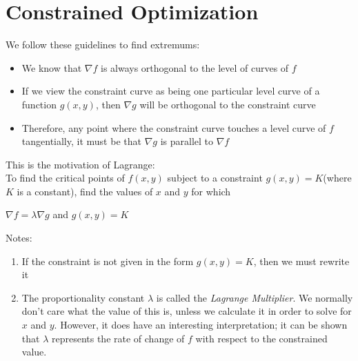 \documentclass[12pt]{report}
\begin{document}
	\section{Constrained Optimization}
		We follow these guidelines to find extremums:
		\begin{itemize}
			\item We know that $\nabla f$ is always orthogonal to the level of curves of $f$
			\item If we view the constraint curve as being one particular level curve of a function $g(x,y)$, then $\nabla g$ will be orthogonal to the constraint curve
			\item Therefore, any point where the constraint curve touches a level curve of $f$ tangentially, it must be that $\nabla g$ is parallel to $\nabla f$
		\end{itemize}
		This is the motivation of Lagrange:\\
		To find the critical points of $f(x,y)$ subject to a constraint $g(x,y) = K$(where $K$ is a constant), find the values of $x$ and $y$ for which\\
		\centerline{$\nabla f = \lambda \nabla g$ and $g(x,y) = K$}
		Notes:
		\begin{enumerate}
			\item If the constraint is not given in the form $g(x,y) = K$, then we must rewrite it
			\item The proportionality constant $\lambda$ is called the \textit{Lagrange Multiplier}. We normally don't care what the value of this is, unless we calculate it in order to solve for $x$ and $y$. However, it does have an interesting interpretation; it can be shown that $\lambda$ represents the rate of change of $f$ with respect to the constrained value.
		\end{enumerate}
\end{document}
